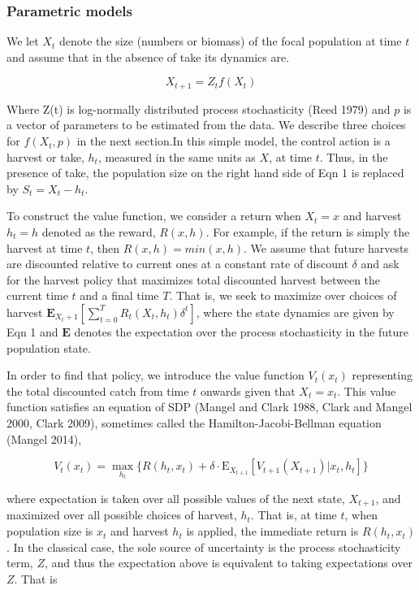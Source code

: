 \documentclass[author-year, 12pt,review]{components/elsarticle} %
\begin{document}
\subsubsection{Parametric models}\label{parametric-models}

We let $X_t$ denote the size (numbers or biomass) of the focal
population at time $t$ and assume that in the absence of take its
dynamics are.

\begin{equation}
X_{t+1}= Z_t f(X_t) \label{eq1} 
\end{equation}

Where Z(t) is log-normally distributed process stochasticity (Reed 1979)
and $p$ is a vector of parameters to be estimated from the data. We
describe three choices for $f(X_t,p)$ in the next section.In this simple
model, the control action is a harvest or take, $h_t$, measured in the
same units as $X$, at time $t$. Thus, in the presence of take, the
population size on the right hand side of Eqn 1 is replaced by
$S_t=X_t-h_t$.

To construct the value function, we consider a return when $X_t=x$ and
harvest $h_t=h$ denoted as the reward, $R(x,h)$. For example, if the
return is simply the harvest at time $t$, then $R(x,h)=min(x,h)$. We
assume that future harvests are discounted relative to current ones at a
constant rate of discount $\delta$ and ask for the harvest policy that
maximizes total discounted harvest between the current time $t$ and a
final time $T$. That is, we seek to maximize over choices of harvest
$\mathbf{E}_{X_t+1} [ \sum_{t = 0}^{T}  R_t(X_t, h_t) \delta^t]$, where
the state dynamics are given by Eqn 1 and $\mathbf{E}$ denotes the
expectation over the process stochasticity in the future population
state.

In order to find that policy, we introduce the value function $V_t(x_t)$
representing the total discounted catch from time $t$ onwards given that
$X_t=x_t$. This value function satisfies an equation of SDP (Mangel and
Clark 1988, Clark and Mangel 2000, Clark 2009), sometimes called the
Hamilton-Jacobi-Bellman equation (Mangel 2014),

\begin{equation}
V_t(x_t) = \max_{h_t} \lbrace R(h_t, x_t) + \delta \cdot \mathbf{\mathrm{E}}_{X_{t+1}} \left[ V_{t+1}( X_{t+1}) | x_t, h_t \right] \rbrace
\end{equation}

where expectation is taken over all possible values of the next state,
$X_{t+1}$, and maximized over all possible choices of harvest, $h_t$.
That is, at time $t$, when population size is $x_t$ and harvest $h_t$ is
applied, the immediate return is $R(h_t, x_t)$. In the classical case,
the sole source of uncertainty is the process stochasticity term, $Z$,
and thus the expectation above is equivalent to taking expectations over
$Z$. That is
\end{document}
